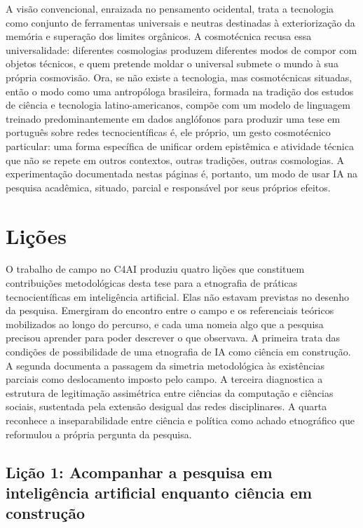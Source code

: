 A visão convencional, enraizada no pensamento ocidental, trata a tecnologia como conjunto de ferramentas universais e neutras destinadas à exteriorização da memória e superação dos limites orgânicos. A cosmotécnica recusa essa universalidade: diferentes cosmologias produzem diferentes modos de compor com objetos técnicos, e quem pretende moldar o universal submete o mundo à sua própria cosmovisão. Ora, se não existe a tecnologia, mas cosmotécnicas situadas, então o modo como uma antropóloga brasileira, formada na tradição dos estudos de ciência e tecnologia latino-americanos, compõe com um modelo de linguagem treinado predominantemente em dados anglófonos para produzir uma tese em português sobre redes tecnocientíficas é, ele próprio, um gesto cosmotécnico particular: uma forma específica de unificar ordem epistêmica e atividade técnica que não se repete em outros contextos, outras tradições, outras cosmologias. A experimentação documentada nestas páginas é, portanto, um modo de usar IA na pesquisa acadêmica, situado, parcial e responsável por seus próprios efeitos.


\section{Lições}

O trabalho de campo no C4AI produziu quatro lições que constituem contribuições metodológicas desta tese para a etnografia de práticas tecnocientíficas em inteligência artificial. Elas não estavam previstas no desenho da pesquisa. Emergiram do encontro entre o campo e os referenciais teóricos mobilizados ao longo do percurso, e cada uma nomeia algo que a pesquisa precisou aprender para poder descrever o que observava. A primeira trata das condições de possibilidade de uma etnografia de IA como ciência em construção. A segunda documenta a passagem da simetria metodológica às existências parciais como deslocamento imposto pelo campo. A terceira diagnostica a estrutura de legitimação assimétrica entre ciências da computação e ciências sociais, sustentada pela extensão desigual das redes disciplinares. A quarta reconhece a inseparabilidade entre ciência e política como achado etnográfico que reformulou a própria pergunta da pesquisa.

\subsection{Lição 1: Acompanhar a pesquisa em inteligência artificial enquanto ciência em construção}
\label{subsec:licao1}

